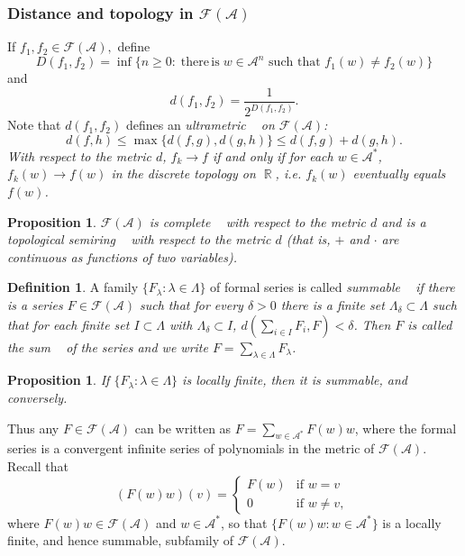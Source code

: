 \documentclass{kepart2010}
\theoremstyle{plain}
\newtheorem{prop}[thm]{Proposition}
\theoremstyle{definition}
\newtheorem{defn}[thm]{Definition}
\theoremstyle{remark}
\theoremstyle{definition}
\numberwithin{equation}{section}
\begin{document}
\subsubsection{Distance and topology in ${\mathcal F ({{\mathcal A}})}$}
If $f_{1}, f_{2} \in {\mathcal F ({{\mathcal A}})},$ define \begin{equation} D(f_{1}, f_{2}) = \inf \{ n
\geq 0: \; \text{there} \, \text{is} \; w \in {{\mathcal A}}^{n} \textrm{ such
that } f_{1}(w) \neq f_{2}(w) \} \end{equation} and \begin{equation} d(f_{1}, f_{2}) = \frac
{1} {2^{D(f_{1}, f_{2})}}. \end{equation} Note that $d(f_{1}, f_{2})$ defines
an \em ultrametric \em~ on ${\mathcal F ({{\mathcal A}})}$:
 \begin{equation} d(f, h) \leq \max \{ d(f,g),d(g, h) \} \leq d(f,g) +d(g,h) .
 \end{equation}
 With respect to the metric
 $d$, $f_{k} \rightarrow f$ if and only if
 for each $w \in {{\mathcal A}}^*$, $f_{k}(w) \rightarrow
f(w)$ in the discrete topology on $\operatorname{\mathbb R}$, i.e.
 $f_k(w)$ eventually equals $f(w)$.
\begin{prop}
${\mathcal F ({{\mathcal A}})}$ is \em complete \em~ with respect to the metric $d$ and is a
\em topological semiring \em~ with respect to the metric $d$ (that
is, $+$ and $\cdot$ are continuous as functions of two variables).
\end{prop}
\begin{defn}
A family $\{ F_{\lambda}: \lambda \in \Lambda \} $ of formal series
is called \em summable \em~ if there is a series $F \in {\mathcal F ({{\mathcal A}})}$ such
that for every $\delta > 0$ there is a finite set $\Lambda_{\delta}
\subset \Lambda$ such that for each finite set $I \subset \Lambda$
with $\Lambda_{\delta} \subset I$, $d(\sum_{i \in I}F_i, F)<
\delta$. Then $F$ is called the \em sum \em~ of the series and we
write
$F= \sum_{\lambda \in \Lambda} F_{\lambda}$.\\
\end{defn}
\begin{prop}
If $\{F_\lambda: \lambda \in \Lambda\}$ is locally finite, then it
is summable, and conversely.
\end{prop}

Thus any $F \in {\mathcal F ({{\mathcal A}})}$ can be written as $F=\sum_{w \in \operatorname{{{\mathcal A}}^{*}}}F(w)w$,
where the formal series is a convergent infinite series of
polynomials in the metric of ${\mathcal F ({{\mathcal A}})}$. Recall that
$$(F(w)w) (v) =  \begin{cases}   F(w) & \text{if $w=v$ }\\   0 &
\text{if $w \neq v,$}    \end{cases}$$ where $F(w)w \in {\mathcal F ({{\mathcal A}})}$ and
$w\in \operatorname{{{\mathcal A}}^{*}}$, so that  $\{F(w)w: w \in \operatorname{{{\mathcal A}}^{*}}\}$ is a
locally finite, and hence summable, subfamily of ${\mathcal F ({{\mathcal A}})}$.\\
\end{document}
